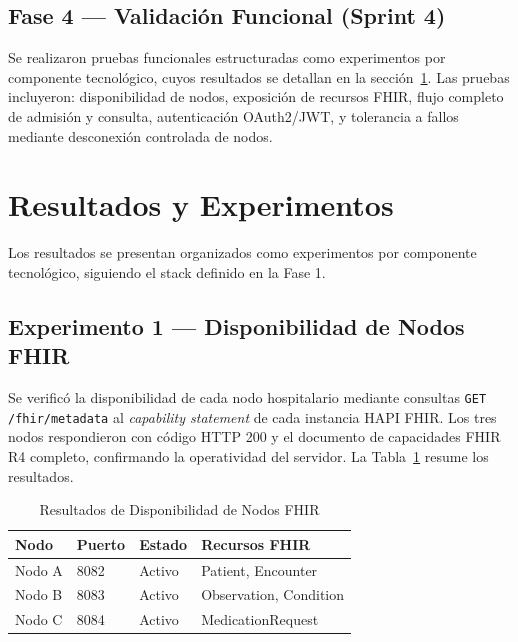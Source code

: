 \documentclass[conference]{IEEEtran}
\begin{document}
\subsection{Fase 4 --- Validaci\'on Funcional (Sprint 4)}

Se realizaron pruebas funcionales estructuradas como experimentos
por componente tecnol\'ogico, cuyos resultados se detallan en la
secci\'on~\ref{sec:resultados}. Las pruebas incluyeron: disponibilidad
de nodos, exposici\'on de recursos FHIR, flujo completo de admisi\'on
y consulta, autenticaci\'on OAuth2/JWT, y tolerancia a fallos mediante
desconexi\'on controlada de nodos.

\section{Resultados y Experimentos}
\label{sec:resultados}

Los resultados se presentan organizados como experimentos por componente
tecnol\'ogico, siguiendo el stack definido en la Fase 1.

\subsection{Experimento 1 --- Disponibilidad de Nodos FHIR}

Se verific\'o la disponibilidad de cada nodo hospitalario mediante
consultas \texttt{GET /fhir/metadata} al \textit{capability statement}
de cada instancia HAPI FHIR. Los tres nodos respondieron con c\'odigo
HTTP 200 y el documento de capacidades FHIR R4 completo, confirmando
la operatividad del servidor. La Tabla~\ref{tab:disponibilidad} resume
los resultados.

\begin{table}[htbp]
\caption{Resultados de Disponibilidad de Nodos FHIR}
\label{tab:disponibilidad}
\begin{center}
\renewcommand{\arraystretch}{1.2}
\begin{tabular}{|p{1.6cm}|p{1.5cm}|p{1.2cm}|p{2.4cm}|}
\hline
\textbf{Nodo} & \textbf{Puerto} & \textbf{Estado} & \textbf{Recursos FHIR} \\
\hline
Nodo A & 8082 & Activo & Patient, Encounter \\
\hline
Nodo B & 8083 & Activo & Observation, Condition \\
\hline
Nodo C & 8084 & Activo & MedicationRequest \\
\hline
\end{tabular}
\end{center}
\end{table}
\end{document}
